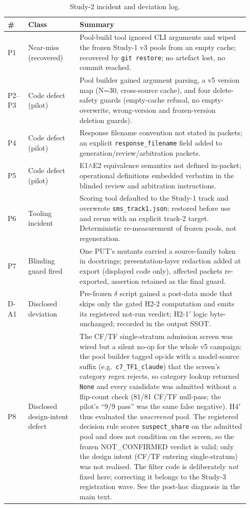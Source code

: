\documentclass[manuscript,screen,review]{acmart}
\begin{document}
{%
\small
\begin{longtable}[]{@{}p{0.08\linewidth}p{0.20\linewidth}p{0.66\linewidth}@{}}
\caption{Study-2 incident and deviation log.}\label{tab:study2-incidents}\\
\toprule\noalign{}
\# & Class & Summary \\
\midrule\noalign{}
\endfirsthead
\endhead
\bottomrule\noalign{}
\endlastfoot
P1 & Near-miss (recovered) & Pool-build tool ignored CLI arguments and wiped the frozen Study-1 v3 pools from an empty cache; recovered by \texttt{git restore}; no artefact lost, no commit reached. \\
P2--P3 & Code defect (pilot) & Pool builder gained argument parsing, a v5 version map (N=30, cross-source cache), and four delete-safety guards (empty-cache refusal, no empty-overwrite, wrong-version and frozen-version deletion guards). \\
P4 & Code defect (pilot) & Response filename convention not stated in packets; an explicit \texttt{response\_filename} field added to generation/review/arbitration packets. \\
P5 & Code defect (pilot) & E1$\wedge$E2 equivalence semantics not defined in-packet; operational definitions embedded verbatim in the blinded review and arbitration instructions. \\
P6 & Tooling incident & Scoring tool defaulted to the Study-1 track and overwrote \texttt{sms\_track1.json}; restored before use and rerun with an explicit track-2 target. Deterministic re-measurement of frozen pools, not regeneration. \\
P7 & Blinding guard fired & One PUT's mutants carried a source-family token in docstrings; presentation-layer redaction added at export (displayed code only), affected packets re-exported, assertion retained as the final guard. \\
D-A1 & Disclosed deviation & Pre-frozen $\delta$ script gained a post-data mode that skips only the gated H2-2 computation and emits its registered not-run verdict; H2-1\('\) logic byte-unchanged; recorded in the output SSOT. \\
P8 & Disclosed design-intent defect & The CF/TF single-stratum admission screen was wired but a silent no-op for the whole v5 campaign: the pool builder tagged op-ids with a model-source suffix (e.g.\ \texttt{c7\_TF1\_claude}) that the screen's category regex rejects, so category lookup returned \texttt{None} and every candidate was admitted without a flip-count check (81/81 CF/TF null-pass; the pilot's ``9/9 pass'' was the same false negative). H4\('\) thus evaluated the \emph{unscreened} pool. The registered decision rule scores \texttt{suspect\_share} on the admitted pool and does not condition on the screen, so the frozen NOT\_CONFIRMED verdict is valid; only the design intent (CF/TF entering single-stratum) was not realised. The filter code is deliberately \emph{not} fixed here; correcting it belongs to the Study-3 registration wave. See the post-hoc diagnosis in the main text. \\

\end{longtable}}
\end{document}
